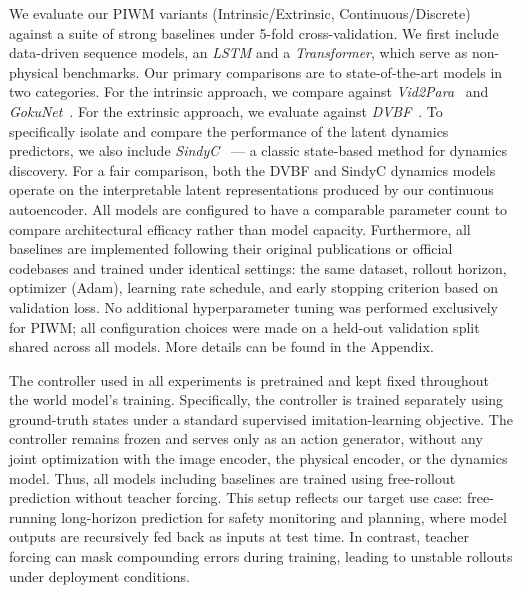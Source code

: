 \documentclass[nonacm,sigconf]{acmart}
\begin{document}
We evaluate our PIWM variants (Intrinsic/Extrinsic, Continuous/Discrete) against a suite of strong baselines under 5-fold cross-validation. We first include data-driven sequence models, an \textit{LSTM} and a \textit{Transformer}, which serve as non-physical benchmarks. Our primary comparisons are to state-of-the-art models in two categories. For the {intrinsic} approach, we compare against \textit{Vid2Para}~\cite[]{asenov2019vid2param} and \textit{GokuNet}~\cite[]{linial_generative_2021}. For the {extrinsic} approach, we evaluate against \textit{DVBF}~\cite[]{karl2016deep}. To specifically isolate and compare the performance of the latent dynamics predictors, we also include \textit{SindyC}~\cite[]{BRUNTON2016710} --- a classic state-based method for dynamics discovery. For a fair comparison, both the DVBF and SindyC dynamics models operate on the interpretable latent representations produced by our continuous autoencoder. All models are configured to have a comparable parameter count to compare architectural efficacy rather than model capacity. Furthermore, all baselines are implemented following their original publications or official codebases and trained under identical settings: the same dataset, rollout horizon, optimizer (Adam), learning rate schedule, and early stopping criterion based on validation loss. No additional hyperparameter tuning was performed exclusively for PIWM; all configuration choices were made on a held-out validation split shared across all models. More details can be found in the Appendix.

The controller used in all experiments is pretrained and kept fixed throughout the world model's training. Specifically, the controller is trained separately using ground-truth states under a standard supervised imitation-learning objective. The controller remains frozen and serves only as an action generator, without any joint optimization with the image encoder, the physical encoder, or the dynamics model. Thus, all models including baselines are trained using free-rollout prediction without teacher forcing. This setup reflects our target use case: free-running long-horizon prediction for safety monitoring and planning, where model outputs are recursively fed back as inputs at test time. In contrast, teacher forcing can mask compounding errors during training, leading to unstable rollouts under deployment conditions. 
\end{document}
